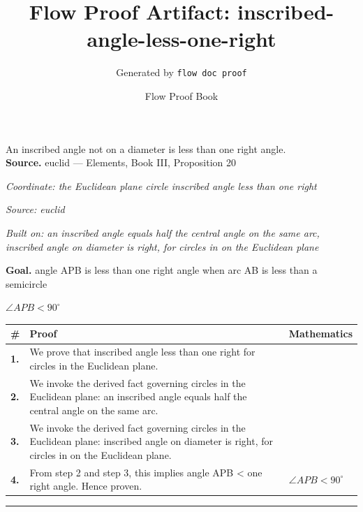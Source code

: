 \documentclass[11pt]{article}
\title{Flow Proof Artifact: inscribed-angle-less-one-right}
\author{Generated by \texttt{flow doc proof}}
\date{Flow Proof Book}
\theoremstyle{definition}
\begin{document}
\maketitle
An inscribed angle not on a diameter is less than one right angle.\\[0.5em]
\textbf{Source.} euclid — Elements, Book III, Proposition 20\\[0.5em]
\bigskip
{}\par
\smallskip\noindent\textit{Coordinate: the Euclidean plane \cdot circle \cdot inscribed angle less than one right}\par
\smallskip\noindent\textit{Source: euclid}\par
\smallskip\noindent\textit{Built on: an inscribed angle equals half the central angle on the same arc, inscribed angle on diameter is right, for circles in on the Euclidean plane}\par
\medskip
\noindent\textbf{Goal.} angle APB is less than one right angle when arc AB is less than a semicircle\par
\noindent$\displaystyle \angle APB < 90^\circ$\par
\medskip
\noindent
\begin{tabular}{@{} >{\raggedright\arraybackslash}p{} >{\raggedright\arraybackslash}p{} >{\raggedleft\arraybackslash}p{} @{}}
\textbf{\#} & \textbf{Proof} & \textbf{Mathematics} \\
\midrule
\textbf{1.} & We prove that inscribed angle less than one right for circles in the Euclidean plane. & \\[0.45em]
\textbf{2.} & We invoke the derived fact governing circles in the Euclidean plane: an inscribed angle equals half the central angle on the same arc. & \\[0.45em]
\textbf{3.} & We invoke the derived fact governing circles in the Euclidean plane: inscribed angle on diameter is right, for circles in on the Euclidean plane. & \\[0.45em]
\textbf{4.} & From step 2 and step 3, this implies angle APB < one right angle. Hence proven. & $\displaystyle \angle APB < 90^\circ$ \\[0.45em]
\bottomrule
\end{tabular}
\label{thm:Geometry-circle-inscribed_angle_less_than_one_right}
\par\medskip\hrule
\end{document}
